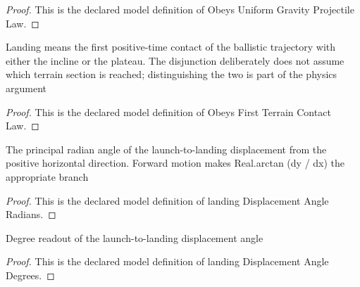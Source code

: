 \begin{proof}
  This is the declared model definition of Obeys Uniform Gravity Projectile Law.
\end{proof}
\begin{definition}
  \label{def:physics:phyx-mini-0744:phyxminiproblems-problemphyxmini0744-obeysfirstterraincontactlaw}
  Landing means the first positive-time contact of the ballistic trajectory with either the incline or the plateau. The disjunction deliberately does not assume which terrain section is reached; distinguishing the two is part of the physics argument
\end{definition}
\begin{proof}
  This is the declared model definition of Obeys First Terrain Contact Law.
\end{proof}
\begin{definition}
  \label{def:physics:phyx-mini-0744:phyxminiproblems-problemphyxmini0744-landingdisplacementangleradians}
  The principal radian angle of the launch-to-landing displacement from the positive horizontal direction. Forward motion makes Real.arctan (dy / dx) the appropriate branch
\end{definition}
\begin{proof}
  This is the declared model definition of landing Displacement Angle Radians.
\end{proof}
\begin{definition}
  \label{def:physics:phyx-mini-0744:phyxminiproblems-problemphyxmini0744-landingdisplacementangledegrees}
  Degree readout of the launch-to-landing displacement angle
\end{definition}
\begin{proof}
  This is the declared model definition of landing Displacement Angle Degrees.
\end{proof}
